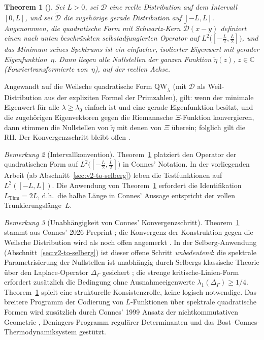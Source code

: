 \documentclass[12pt,a4paper]{article}
\newtheorem{theorem}{Theorem}[section]
\theoremstyle{definition}
\theoremstyle{remark}
\newtheorem{remark}[theorem]{Bemerkung}
\newcommand{\QW}{\mathrm{QW}}
\newcommand{\Delop}{\Delta_{\Gamma}}
\begin{document}
\begin{theorem}[{\cite[Theorem~6.1]{Connes2026}}]
\label{thm:connes}
Sei $L > 0$, sei $\mathcal{D}$ eine reelle Distribution auf dem Intervall
$[0,L]$, und sei $\tilde{\mathcal{D}}$ die zugehörige gerade Distribution
auf $[-L,L]$.  Angenommen, die quadratische Form mit Schwartz-Kern
$\tilde{\mathcal{D}}(x-y)$ definiert einen nach unten beschränkten selbstadjungierten Operator auf
$L^2\!\bigl([-\tfrac{L}{2},\tfrac{L}{2}]\bigr)$, und das Minimum seines
Spektrums ist ein einfacher, isolierter Eigenwert mit gerader Eigenfunktion~$\eta$.
Dann liegen alle Nullstellen der ganzen Funktion $\tilde\eta(z)$, $z\in\mathbb{C}$
(Fouriertransformierte von\/~$\eta$), auf der reellen Achse.
\end{theorem}

Angewandt auf die Weilsche quadratische Form $\QW_\lambda$ (mit $\mathcal{D}$ als Weil-Distribution
aus der expliziten Formel der Primzahlen), gilt: wenn der minimale Eigenwert
für alle $\lambda\ge\lambda_0$ einfach ist und eine gerade Eigenfunktion besitzt, und die
zugehörigen Eigenvektoren gegen die Riemannsche $\Xi$-Funktion konvergieren, dann stimmen die
Nullstellen von $\tilde\eta$ mit denen von $\Xi$ überein; folglich gilt die RH.  Der
Konvergenzschritt bleibt offen \cite[\S6.6]{Connes2026}.

\begin{remark}[Intervallkonvention]
\label{rem:interval-convention}
Theorem~\ref{thm:connes} platziert den Operator der quadratischen Form auf
$L^2\!\bigl([-\tfrac{L}{2},\tfrac{L}{2}]\bigr)$ in Connes' Notation.
In der vorliegenden Arbeit (ab Abschnitt~\ref{sec:v2-to-selberg})
leben die Testfunktionen auf $L^2([-L,L])$.  Die Anwendung von
Theorem~\ref{thm:connes} erfordert die Identifikation $L_{\mathrm{Thm}} = 2L$,
d.h.\ die halbe Länge in Connes' Aussage entspricht der vollen Trunkierungslänge~$L$.
\end{remark}

\begin{remark}[Unabhängigkeit von Connes' Konvergenzschritt]
\label{rem:connes-hedge}
Theorem~\ref{thm:connes} stammt aus Connes' 2026 Preprint \cite{Connes2026};
die Konvergenz der Konstruktion gegen die Weilsche Distribution wird als noch offen angemerkt
\cite[\S6.6]{Connes2026}.  In der Selberg-Anwendung
(Abschnitt~\ref{sec:v2-to-selberg}) ist dieser offene Schritt \emph{unbedeutend}: die
spektrale Parametrisierung der Nullstellen ist unabhängig durch Selbergs
klassische Theorie über den Laplace-Operator $\Delop$ gesichert
\cite{Selberg1956}; die strenge kritische-Linien-Form erfordert zusätzlich
die Bedingung ohne Ausnahmeeigenwerte $\lambda_1(\Delop)\ge 1/4$.
Theorem~\ref{thm:connes} spielt eine strukturelle Konsistenzrolle, keine logisch
notwendige.  Das breitere Programm der Codierung von $L$-Funktionen über spektrale
quadratische Formen wird zusätzlich durch Connes' 1999 Ansatz der nichtkommutativen
Geometrie \cite{Connes1999}, Deningers Programm regulärer Determinanten
\cite{Deninger1994} und das Bost--Connes-Thermodynamiksystem
\cite{BostConnes1995} gestützt.
\end{remark}
\end{document}
